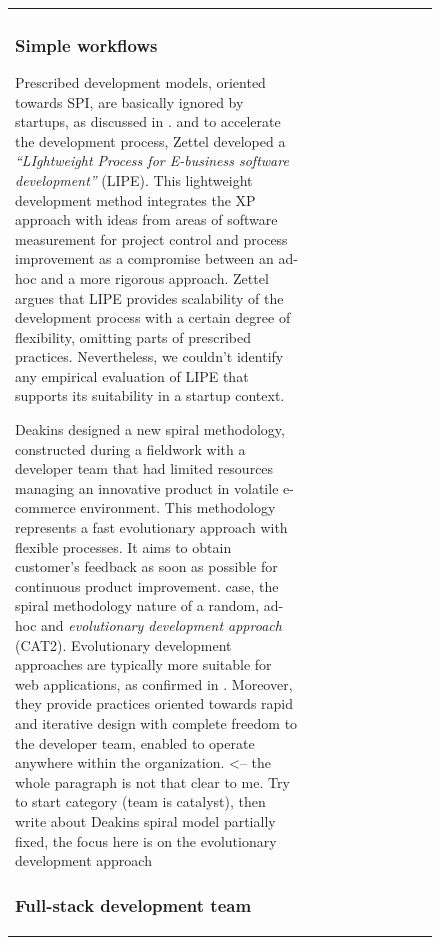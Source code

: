 \documentclass[12pt,journal,compsoc]{../sty/IEEEtran}
\begin{document}
\begin{table}[!t]
\begin{figure}[!t]
\begin{compactitem}
\begin{table}[!t]
\begin{tabular}{|l||c||c||c||c||c||c||c||c||c|}
\subsubsection{Simple workflows} Prescribed development models, oriented towards
SPI, are basically ignored by  startups, as discussed in \cite{Zettel2001}.
and to accelerate the development process,  Zettel developed a
\textit{``LIghtweight Process for E-business software  development''} (LIPE).
This lightweight development method integrates the XP  approach with ideas from
areas of software measurement for project control and  process improvement as a
compromise between an ad-hoc and a more rigorous  approach. Zettel argues that
LIPE provides scalability of the development  process with a certain degree of
flexibility, omitting parts of prescribed  practices. Nevertheless, we couldn't
identify any empirical evaluation of LIPE  that supports its suitability in a
startup context.


Deakins \cite{Deakins2005} designed a new spiral methodology, constructed
during a fieldwork with a developer team that had limited resources managing an
innovative product in volatile e-commerce environment. This methodology
represents a fast evolutionary approach with flexible processes.  It aims to
obtain customer's feedback as soon as possible for continuous  product
improvement.%
case, the spiral methodology%
nature of a random, ad-hoc and  \textit{evolutionary  development approach}
(CAT2). Evolutionary development approaches are  typically more suitable for web
applications, as confirmed in  \cite{Deshpande2001}. Moreover, they provide
practices oriented towards rapid and iterative design  with complete freedom to
the developer team, enabled to operate anywhere within  the organization. %
<-- the whole paragraph is not that clear to me. Try to start  %
category (team is catalyst), then write about Deakins spiral model %
partially fixed, the focus here is on the evolutionary development approach

\subsubsection{Full-stack development team}


\end{tabular}
\end{table}
\end{compactitem}
\end{figure}
\end{table}
\end{document}
